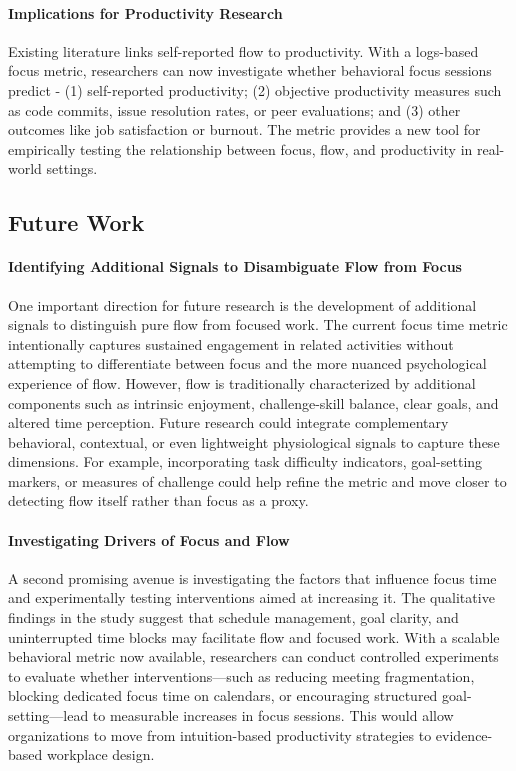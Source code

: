 \paragraph{Implications for Productivity Research}
Existing literature links self-reported flow to productivity. With a logs-based focus metric, researchers can now investigate whether behavioral focus sessions predict - (1) self-reported productivity; (2) objective productivity measures such as code commits, issue resolution rates, or peer evaluations; and (3) other outcomes like job satisfaction or burnout. The metric provides a new tool for empirically testing the relationship between focus, flow, and productivity in real-world settings.

\subsection{Future Work}
\paragraph{Identifying Additional Signals to Disambiguate Flow from Focus}
One important direction for future research is the development of additional signals to distinguish pure flow from focused work. The current focus time metric intentionally captures sustained engagement in related activities without attempting to differentiate between focus and the more nuanced psychological experience of flow. However, flow is traditionally characterized by additional components such as intrinsic enjoyment, challenge-skill balance, clear goals, and altered time perception. Future research could integrate complementary behavioral, contextual, or even lightweight physiological signals to capture these dimensions. For example, incorporating task difficulty indicators, goal-setting markers, or measures of challenge could help refine the metric and move closer to detecting flow itself rather than focus as a proxy.

\paragraph{Investigating Drivers of Focus and Flow}
A second promising avenue is investigating the factors that influence focus time and experimentally testing interventions aimed at increasing it. The qualitative findings in the study suggest that schedule management, goal clarity, and uninterrupted time blocks may facilitate flow and focused work. With a scalable behavioral metric now available, researchers can conduct controlled experiments to evaluate whether interventions—such as reducing meeting fragmentation, blocking dedicated focus time on calendars, or encouraging structured goal-setting—lead to measurable increases in focus sessions. This would allow organizations to move from intuition-based productivity strategies to evidence-based workplace design.

